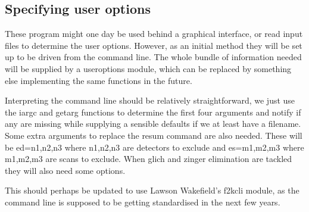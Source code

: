 \documentclass[10pt,a4paper,notitlepage]{article}
\begin{document}
\subsection{Specifying user options}
These program might one day be used behind a graphical interface, or read input
files to determine the user options. However, as an initial method they will
be set up to be driven from the command line. The whole bundle of information
needed will be supplied by a useroptions module, which can be replaced by
something else implementing the same functions in the future.

Interpreting the command line should be relatively straightforward, we just
use the iargc and getarg functions to determine the first four arguments and 
notify if any are missing while supplying a sensible defaults if we at 
least have a filename.
Some extra arguments to replace the resum command are also needed. 
These will be ed=n1,n2,n3 where n1,n2,n3 are detectors to exclude
and es=m1,m2,m3 where m1,m2,m3 are scans to exclude.
When glich and zinger elimination are tackled they will also need some options.

This should perhaps be updated to use Lawson Wakefield's f2kcli module, as the 
command line is supposed to be getting standardised in the next few years.
      
\end{document}
